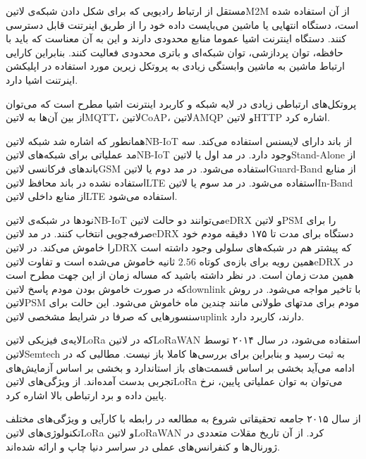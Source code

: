 مستقل از ارتباط رادیویی که برای شکل دادن شبکه‌ی ‌لاتین{M2M} از آن استفاده شده است، دستگاه انتهایی یا ماشین می‌بایست داده خود را از طریق اینرتنت قابل دسترسی کنند.
دستگاه اینترنت اشیا عموما منابع محدودی دارند و این به آن معناست که باید با حافظه، توان پردازشی، توان شبکه‌ای و باتری محدودی فعالیت کنند.
بنابراین کارایی ارتباط ماشین به ماشین وابستگی زیادی به پروتکل زیرین مورد استفاده در اپلیکشن اینرتنت اشیا دارد.

پروتکل‌های ارتباطی زیادی در لایه شبکه و کاربرد اینترنت اشیا مطرح است که می‌توان از بین آن‌ها به ‌لاتین{MQTT}، ‌لاتین{CoAP}، ‌لاتین{AMQP} و ‌لاتین{HTTP} اشاره کرد.


همانطور که اشاره شد شبکه ‌لاتین{NB-IoT} از باند دارای لایسنس استفاده می‌کند. سه مد عملیاتی برای شبکه‌های ‌لاتین{NB-IoT} وجود دارد.
در مد اول یا ‌لاتین{Stand-Alone} از باندهای فرکانسی ‌لاتین{GSM} استفاده می‌شود.
در مد دوم یا ‌لاتین{Guard-Band} از منابع استفاده نشده در باند محافظ ‌لاتین{LTE} استفاده می‌شود.
در مد سوم یا ‌لاتین{In-Band} از منابع داخلی ‌لاتین{LTE} استفاده می‌شود.

نودها در شبکه‌ی ‌لاتین{NB-IoT} می‌توانند دو حالت ‌لاتین{eDRX} و ‌لاتین{PSM} را برای صرفه‌جویی انتخاب کنند.
در مد ‌لاتین{eDRX} دستگاه برای مدت تا ۱۷۵ دقیقه مودم خود را خاموش می‌کند.
در ‌لاتین{DRX} که پیشتر هم در شبکه‌های سلولی وجود داشته است همین رویه برای بازه‌ی کوتاه $2.56$ ثانیه خاموش می‌شده است
و تفاوت ‌لاتین{eDRX} در همین مدت زمان است.
در نظر داشته باشید که مساله زمان از این جهت مطرح است که در صورت خاموش بودن مودم پاسخ ‌لاتین{downlink} با تاخیر مواجه می‌شود.
در روش ‌لاتین{PSM} مودم برای مدتهای طولانی مانند چندین ماه خاموش می‌شود.
این حالت برای سنسورهایی که صرفا در شرایط مشخصی ‌لاتین{uplink} دارند، کاربرد دارد.


لایه‌ی فیزیکی ‌لاتین{LoRa} که در ‌لاتین{LoRaWAN} استفاده می‌شود، در سال ۲۰۱۴ توسط ‌لاتین{Semtech} به ثبت رسید
و بنابراین برای بررسی‌ها کاملا باز نیست. مطالبی که در ادامه می‌آید بخشی بر اساس قسمت‌های باز استاندارد و بخشی بر اساس آزمایش‌های
تجربی بدست آمده‌اند.
از ویژگی‌های ‌لاتین{LoRa} می‌توان به توان عملیاتی پایین، نرخ پایین داده و برد ارتباطی بالا اشاره کرد.

از سال ۲۰۱۵ جامعه تحقیقاتی شروع به مطالعه در رابطه با کارآیی و ویژگی‌های مختلف تکنولوژی‌های ‌لاتین{LoRa} و ‌لاتین{LoRaWAN} کرد.
از آن تاریخ مقلات متعددی در ژورنال‌ها و کنفرانس‌های عملی در سراسر دنیا چاپ و ارائه شده‌اند.

